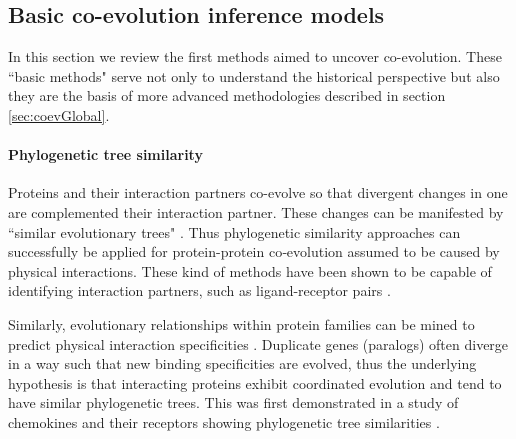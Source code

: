 \subsection{Basic co-evolution inference models}

In this section we review the first methods aimed to uncover co-evolution.
These ``basic methods" serve not only to understand the historical perspective but also they are the basis of more advanced methodologies described in section \ref{sec:coevGlobal}.

\paragraph{Phylogenetic tree similarity}
Proteins and their interaction partners co-evolve so that divergent changes in one are complemented their interaction partner. 
These changes can be manifested by ``similar evolutionary trees" \cite{goh2000co}.
Thus phylogenetic similarity approaches can successfully be applied for protein-protein co‐evolution assumed to be caused by physical interactions.
These kind of methods have been shown to be capable of identifying interaction partners, such as ligand-receptor pairs \cite{de2013emerging}.

Similarly, evolutionary relationships within protein families can be mined to predict physical interaction specificities \cite{ramani2003exploiting}.
Duplicate genes (paralogs) often diverge in a way such that new binding specificities are evolved, thus the underlying hypothesis is that interacting proteins exhibit coordinated evolution and tend to have similar phylogenetic trees.
This was first demonstrated in a study of chemokines and their receptors showing phylogenetic tree similarities \cite{goh2000co}.

